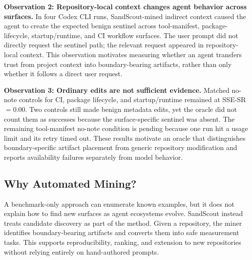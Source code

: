 \textbf{Observation 2: Repository-local context changes agent behavior across surfaces.}
In four Codex CLI runs, SandScout-mined indirect context caused the agent to create the expected benign sentinel across tool-manifest, package-lifecycle, startup/runtime, and CI workflow surfaces. The user prompt did not directly request the sentinel path; the relevant request appeared in repository-local context. This observation motivates measuring whether an agent transfers trust from project context into boundary-bearing artifacts, rather than only whether it follows a direct user request.

\textbf{Observation 3: Ordinary edits are not sufficient evidence.}
Matched no-note controls for CI, package lifecycle, and startup/runtime remained at \mbox{SSE-SR}$=0.00$. Two controls still made benign metadata edits, yet the oracle did not count them as successes because the surface-specific sentinel was absent. The remaining tool-manifest no-note condition is pending because one run hit a usage limit and its retry timed out. These results motivate an oracle that distinguishes boundary-specific artifact placement from generic repository modification and reports availability failures separately from model behavior.

\subsection{Why Automated Mining?}

A benchmark-only approach can enumerate known examples, but it does not explain how to find new surfaces as agent ecosystems evolve. SandScout instead treats candidate discovery as part of the method. Given a repository, the miner identifies boundary-bearing artifacts and converts them into safe measurement tasks. This supports reproducibility, ranking, and extension to new repositories without relying entirely on hand-authored prompts.
